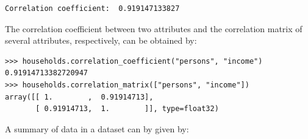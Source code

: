 \begin{center}
\end{center}

\begin{verbatim}
Correlation coefficient:  0.919147133827
\end{verbatim}

The correlation coefficient between two attributes and the correlation matrix of several attributes, respectively,
can be obtained by:
\begin{verbatim}
>>> households.correlation_coefficient("persons", "income")
0.91914713382720947
>>> households.correlation_matrix(["persons", "income"])
array([[ 1.        ,  0.91914713],
       [ 0.91914713,  1.        ]], type=float32)
\end{verbatim}

A summary of data in a dataset can by given by:

